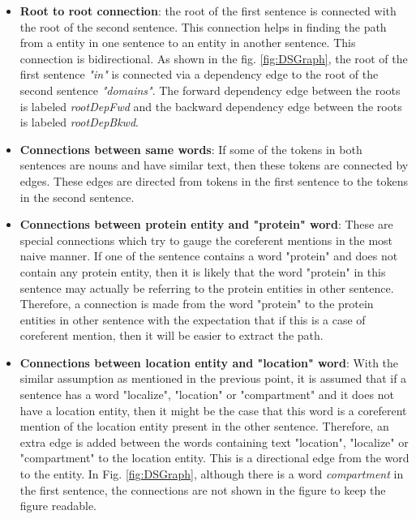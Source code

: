 \begin{itemize}

\item \textbf{Root to root connection}: the root of the first sentence is connected with the root of the second sentence. This connection helps in finding the path from a entity in one sentence to an entity in another sentence. This connection is bidirectional. As shown in the fig. \ref{fig:DSGraph}, the root of the first sentence \textit{"in"} is connected via a dependency edge to the root of the second sentence \textit{"domains"}. The forward dependency edge between the roots is labeled \textit{rootDepFwd} and the backward dependency edge between the roots is labeled \textit{rootDepBkwd}.

\item \textbf{Connections between same words}: If some of the tokens in both sentences are nouns and have similar text, then these tokens are connected by edges. These edges are directed from tokens in the first sentence to the tokens in the second sentence.

\item \textbf{Connections between protein entity and "protein" word}: These are special connections which try to gauge the coreferent mentions in the most naive manner. If one of the sentence contains a word "protein" and does not contain any protein entity, then it is likely that the word "protein" in this sentence may actually be referring to the protein entities in other sentence. Therefore, a connection is made from the word "protein" to the protein entities in other sentence with the expectation that if this is a case of coreferent mention, then it will be easier to extract the path.

\item \textbf{Connections between location entity and "location" word}: With the similar assumption as mentioned in the previous point, it is assumed that if a sentence has a word "localize", "location" or "compartment" and it does not have a location entity, then it might be the case that this word is a coreferent mention of the location entity present in the other sentence. Therefore, an extra edge is added between the words containing text "location", "localize" or "compartment" to the location entity. This is a directional edge from the word to the entity. In Fig. \ref{fig:DSGraph}, although there is a word \textit{compartment} in the first sentence, the connections are not shown in the figure to keep the figure readable.

\end{itemize}

